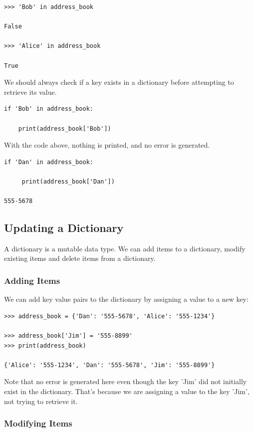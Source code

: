 \documentclass{article}
\begin{document}
\begin{lstlisting}
>>> 'Bob' in address_book

False

>>> 'Alice' in address_book

True
\end{lstlisting}

We should always check if a key exists in a dictionary before attempting to retrieve its value.

\begin{lstlisting}
if 'Bob' in address_book:

    print(address_book['Bob'])
\end{lstlisting}

With the code above, nothing is printed, and no error is generated.

\begin{lstlisting}
if 'Dan' in address_book:

     print(address_book['Dan'])    

555-5678
\end{lstlisting}

\subsection{Updating a Dictionary}

A dictionary is a mutable data type.  We can add items to a dictionary, modify existing items and delete items from a dictionary.

\subsubsection{Adding Items}
We can add key value pairs to the dictionary by assigning a value to a new key:

\begin{lstlisting}
>>> address_book = {'Dan': '555-5678', 'Alice': '555-1234'}

>>> address_book['Jim'] = '555-8899'
>>> print(address_book)

{'Alice': '555-1234', 'Dan': '555-5678', 'Jim': '555-8899'}
\end{lstlisting}

Note that no error is generated here even though the key 'Jim' did not initially exist in the dictionary.  That's because we are assigning a value to the key 'Jim', not trying to retrieve it.  

\subsubsection{Modifying Items}
\end{document}
